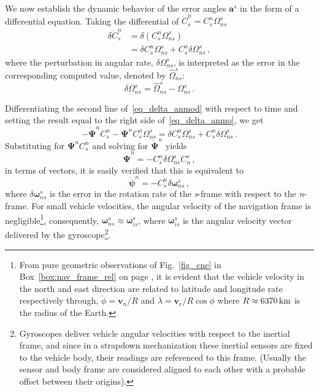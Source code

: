 \documentclass[journal]{IEEEtran}
\begin{document}
We now establish the dynamic behavior of the error angles ${\boldsymbol{a}}^{s}$ in the form of a differential equation. Taking the differential of $\dot{C}_{s}^{n}={C}_{s}^{n} \Omega_{ns}^s $
\begin{equation}\label{eq_delta_anmo}
\begin{split}
    \delta \dot{C}_{s}^{n}&=\delta({C}_{s}^{n} \Omega_{ns}^s)\\
    &=\delta{C}_{s}^{n} \Omega_{ns}^s+ {C}_{s}^{n} \delta\Omega_{ns}^s\,,
    \end{split}
\end{equation}
where the perturbation in angular rate, $\delta\Omega_{ns}^s$, is interpreted as the error in the corresponding computed value, denoted by $\hat{\Omega}_{ns}^s$:
\begin{equation}\label{eq_ggggg}
     \delta\Omega_{ns}^s=\hat{\Omega}_{ns}^s - {\Omega}_{ns}^s\,.
\end{equation}

Differentiating the second line of~\eqref{eq_delta_anmod} with respect to time and setting the result equal to the right side of~\eqref{eq_delta_anmo}, we get
\begin{equation}\label{eq_fffggg}
   - \dot{\boldsymbol{\Psi}}^n C_{s}^{n} -\boldsymbol{\Psi}^n C_{s}^{n}\Omega_{ns}^s=\delta{C}_{s}^{n} \Omega_{ns}^s+ {C}_{s}^{n} \delta\Omega_{ns}^s\,.
\end{equation}
Substituting for $\boldsymbol{\Psi}^n C_{s}^{n}$ and solving for $\dot{\boldsymbol{\Psi}}^n$ yields
\begin{equation}\label{eq_fffgggkkk}
   \dot{\boldsymbol{\Psi}}^n = -{C}_{s}^{n} \delta\Omega_{ns}^s {C}_{n}^{s}\,,
\end{equation}
in terms of vectors, it is easily verified that this is equivalent to 
\begin{equation}\label{eq_fffgggkkkjj}
   \dot{\boldsymbol{\psi}}^n = -{C}_{s}^{n} \delta\boldsymbol\omega_{ns}^s\,, 
\end{equation}
where $\delta\boldsymbol\omega_{ns}^s$ is the error in the rotation rate of the \textit{s}-frame with respect to the \textit{n}-frame. For small vehicle velocities, the  angular velocity of the navigation frame  is negligible\footnote{From pure geometric  observations of Fig.~\ref{fig_cne} in Box~\ref{box:nav_frame_rel} on page \pageref{box:nav_frame_rel}, it is evident that the vehicle velocity in the north and east direction are related to latitude and longitude rate respectively  through, $\dot\phi={\boldsymbol{v}_n}/{R}$ and $\dot\lambda= \boldsymbol{v}_e / R\cos\phi$ where $R\approx\unit[6370]{km}$  is the radius of the Earth.\label{foot1}}, consequently,  $\boldsymbol\omega_{ns}^s\approx \boldsymbol\omega_{is}^s $, where $\boldsymbol\omega_{is}^s$ is the angular velocity vector delivered by the gyroscope\footnote{Gyroscopes deliver vehicle  angular velocities  with respect to the inertial frame, and since in a strapdown mechanization these inertial sensors are fixed to the vehicle body, their readings are referenced to  this frame. (Usually the sensor and body frame are considered aligned to each other with a probable offset between their origins).}.
\end{document}

